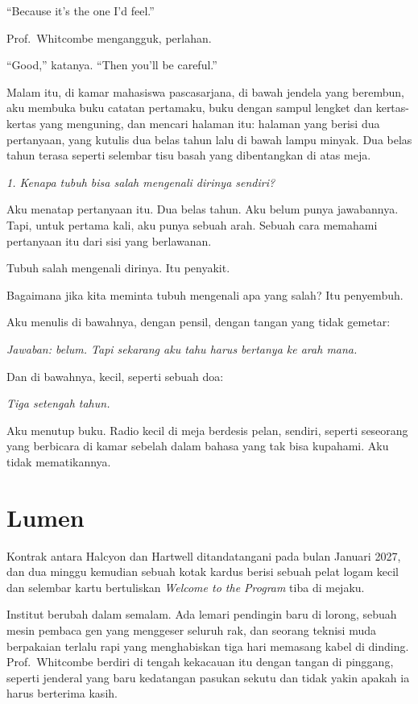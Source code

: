 \documentclass[11pt,twoside,openany]{book}
\makeatletter
\newcommand{\scenebreak}{\par\vspace{0.9em}{\centering\textsc{*\hspace{0.7em}*\hspace{0.7em}*}\par}\vspace{0.9em}\@afterindentfalse\@afterheading}
\makeatother
\begin{document}
``Because it's the one I'd feel.''

Prof.~Whitcombe mengangguk, perlahan.

``Good,'' katanya. ``Then you'll be careful.''

\scenebreak
Malam itu, di kamar mahasiswa pascasarjana, di bawah jendela yang berembun, aku membuka buku catatan pertamaku, buku dengan sampul lengket dan kertas-kertas yang menguning, dan mencari halaman itu: halaman yang berisi dua pertanyaan, yang kutulis dua belas tahun lalu di bawah lampu minyak. Dua belas tahun terasa seperti selembar tisu basah yang dibentangkan di atas meja.

\emph{1. Kenapa tubuh bisa salah mengenali dirinya sendiri?}

Aku menatap pertanyaan itu. Dua belas tahun. Aku belum punya jawabannya. Tapi, untuk pertama kali, aku punya sebuah arah. Sebuah cara memahami pertanyaan itu dari sisi yang berlawanan.

Tubuh salah mengenali dirinya. Itu penyakit.

Bagaimana jika kita meminta tubuh mengenali apa yang salah? Itu penyembuh.

Aku menulis di bawahnya, dengan pensil, dengan tangan yang tidak gemetar:

\emph{Jawaban: belum. Tapi sekarang aku tahu harus bertanya ke arah mana.}

Dan di bawahnya, kecil, seperti sebuah doa:

\emph{Tiga setengah tahun.}

Aku menutup buku. Radio kecil di meja berdesis pelan, sendiri, seperti seseorang yang berbicara di kamar sebelah dalam bahasa yang tak bisa kupahami. Aku tidak mematikannya.

\chapter{Lumen}
Kontrak antara Halcyon dan Hartwell ditandatangani pada bulan Januari 2027, dan dua minggu kemudian sebuah kotak kardus berisi sebuah pelat logam kecil dan selembar kartu bertuliskan \emph{Welcome to the Program} tiba di mejaku.

Institut berubah dalam semalam. Ada lemari pendingin baru di lorong, sebuah mesin pembaca gen yang menggeser seluruh rak, dan seorang teknisi muda berpakaian terlalu rapi yang menghabiskan tiga hari memasang kabel di dinding. Prof.~Whitcombe berdiri di tengah kekacauan itu dengan tangan di pinggang, seperti jenderal yang baru kedatangan pasukan sekutu dan tidak yakin apakah ia harus berterima kasih.
\end{document}
